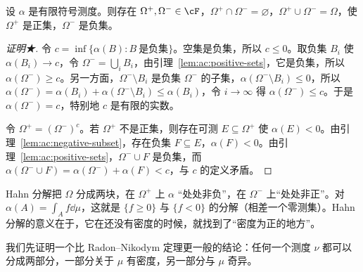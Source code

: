 \begin{theorem}[Hahn 分解]\label{thm:ac:hahn}
设 $\alpha$ 是有限符号测度。则存在 $\Omega^+,\Omega^-\in\cF$，$\Omega^+\cap\Omega^-=\varnothing$，$\Omega^+\cup\Omega^-=\Omega$，使 $\Omega^+$ 是正集，$\Omega^-$ 是负集。
\end{theorem}
\begin{proof}[证明★]
令 $c=\inf\{\alpha(B):B\ \text{是负集}\}$。空集是负集，所以 $c\leqslant0$。取负集 $B_i$ 使 $\alpha(B_i)\to c$，令 $\Omega^-=\bigcup_iB_i$，由引理~\ref{lem:ac:positive-sets}，它是负集，所以 $\alpha(\Omega^-)\geqslant c$。另一方面，$\Omega^-\setminus B_i$ 是负集 $\Omega^-$ 的子集，$\alpha(\Omega^-\setminus B_i)\leqslant0$，所以 $\alpha(\Omega^-)=\alpha(B_i)+\alpha(\Omega^-\setminus B_i)\leqslant\alpha(B_i)$，令 $i\to\infty$ 得 $\alpha(\Omega^-)\leqslant c$。于是 $\alpha(\Omega^-)=c$，特别地 $c$ 是有限的实数。

令 $\Omega^+=(\Omega^-)^c$。若 $\Omega^+$ 不是正集，则存在可测 $E\subseteq\Omega^+$ 使 $\alpha(E)<0$。由引理~\ref{lem:ac:negative-subset}，存在负集 $F\subseteq E$，$\alpha(F)<0$。由引理~\ref{lem:ac:positive-sets}，$\Omega^-\cup F$ 是负集，而 $\alpha(\Omega^-\cup F)=\alpha(\Omega^-)+\alpha(F)<c$，与 $c$ 的定义矛盾。
\end{proof}

Hahn 分解把 $\Omega$ 分成两块，在 $\Omega^+$ 上 $\alpha$ “处处非负”，在 $\Omega^-$ 上“处处非正”。对 $\alpha(A)=\int_Af\dd\mu$，这就是 $\{f\geqslant0\}$ 与 $\{f<0\}$ 的分解（相差一个零测集）。Hahn 分解的意义在于，它在还没有密度的时候，就找到了“密度为正的地方”。


我们先证明一个比 Radon--Nikodym 定理更一般的结论：任何一个测度 $\nu$ 都可以分成两部分，一部分关于 $\mu$ 有密度，另一部分与 $\mu$ 奇异。

